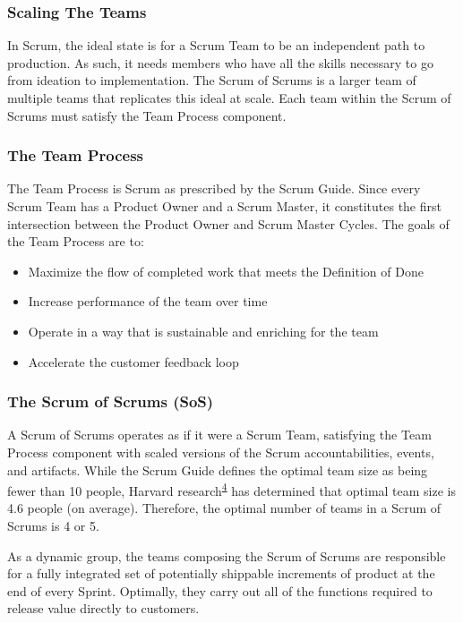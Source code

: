 \documentclass[12pt,a4paper,parskip=full]{scrartcl}
\begin{document}
\subsubsection{Scaling The Teams}\label{scaling-the-teams}

In Scrum, the ideal state is for a Scrum Team to be an independent path to production. As such, it needs members who have all the skills necessary to go from ideation to implementation. The Scrum of Scrums is a larger team of multiple teams that replicates this ideal at scale. Each team within the Scrum of Scrums must satisfy the Team Process component.

\subsubsection{The Team Process}\label{the-team-process}

The Team Process is Scrum as prescribed by the Scrum Guide. Since every Scrum Team has a Product Owner and a Scrum Master, it constitutes the first intersection between the Product Owner and Scrum Master Cycles. The goals of the Team Process are to:
\begin{itemize}
\itemsep1pt\parskip0pt
\item
 Maximize the flow of completed work that meets the Definition of Done
\item
  Increase performance of the team over time
\item
  Operate in a way that is sustainable and enriching for the team
\item
  Accelerate the customer feedback loop
\end{itemize}

\subsubsection{The Scrum of Scrums (SoS)}\label{the-scrum-of-scrums}

A Scrum of Scrums operates as if it were a Scrum Team, satisfying the Team Process component with scaled versions of the Scrum accountabilities, events, and artifacts. While the Scrum Guide defines the optimal team size as being fewer than 10 people, Harvard research\textsuperscript{\hyperref[citation4]{4}}  has determined that optimal team size is 4.6 people (on average). Therefore, the optimal number of teams in a Scrum of Scrums is 4 or 5.

As a dynamic group, the teams composing the Scrum of Scrums are responsible for a fully integrated set of potentially shippable increments of product at the end of every Sprint. Optimally, they carry out all of the functions required to release value directly to customers.
\end{document}
